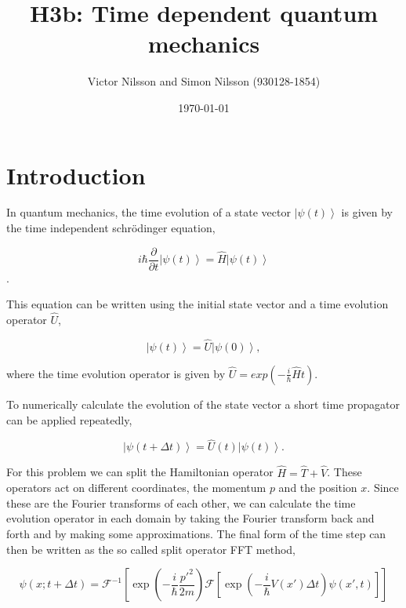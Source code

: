 



\title{H3b: Time dependent quantum mechanics}
\author{Victor Nilsson and Simon Nilsson (930128-1854)}
\date{\today}





\section*{Introduction}

In quantum mechanics, the time evolution of a state vector $\left|\psi(t)\right>$ is given by the time independent schrödinger equation,

\begin{equation}
i\hbar\frac{\partial}{\partial t}\left|\psi(t)\right> = \hat{H}\left|\psi(t)\right>
\end{equation}.

This equation can be written using the initial state vector and a time evolution operator $\hat{U}$,

\begin{equation}
\left|\psi(t)\right> = \hat{U}\left|\psi(0)\right>,
\end{equation}

where the time evolution operator is given by $\hat{U}=exp\left(-\frac{i}{\hbar}\hat{H}t\right)$.

To numerically calculate the evolution of the state vector a short time propagator can be applied repeatedly,

\begin{equation}
\left|\psi(t+\Delta t)\right> = \hat{U}(t)\left|\psi(t)\right>.
\end{equation}

For this problem we can split the Hamiltonian operator $\hat{H}=\hat{T}+\hat{V}$. These operators act on different coordinates, the momentum $p$ and the position $x$. Since these are the Fourier transforms of each other, we can calculate the time evolution operator in each domain by taking the Fourier transform back and forth and by making some approximations. The final form of the time step can then be written as the so called split operator FFT method,

\begin{equation}
\psi(x;t+\Delta t)= \mathcal{F}^{-1}\left[\exp\left(-\frac{i}{\hbar}\frac{p'^{2}}{2m}\right)\mathcal{F}\left[\exp\left(-\frac{i}{\hbar}V(x')\Delta t\right)\psi(x',t)\right]\right]
\end{equation}

